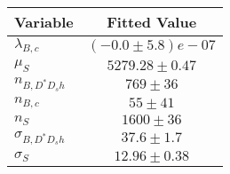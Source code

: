 \begin{tabular}[t]{lc}
\hline
Variable &Fitted Value\\
\hline\hline
$\lambda_{B,c}$&$(-0.0\pm5.8)e-07$\\
\hline
$\mu_S$&$5279.28\pm0.47$\\
\hline
$n_{B, D^* D_s h}$&$769\pm36$\\
\hline
$n_{B,c}$&$55\pm41$\\
\hline
$n_S$&$1600\pm36$\\
\hline
$\sigma_{B, D^* D_s h}$&$37.6\pm1.7$\\
\hline
$\sigma_S$&$12.96\pm0.38$\\
\hline
\end{tabular}
